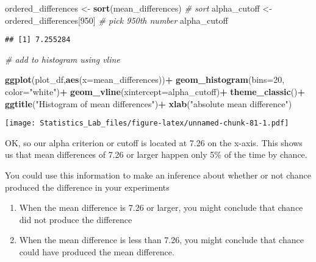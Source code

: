 \documentclass[
]{book}
\newenvironment{Shaded}{\begin{snugshade}}{\end{snugshade}}
\newcommand{\AttributeTok}[1]{\textcolor[rgb]{0.13,0.29,0.53}{#1}}
\newcommand{\CommentTok}[1]{\textcolor[rgb]{0.56,0.35,0.01}{\textit{#1}}}
\newcommand{\DecValTok}[1]{\textcolor[rgb]{0.00,0.00,0.81}{#1}}
\newcommand{\FunctionTok}[1]{\textcolor[rgb]{0.13,0.29,0.53}{\textbf{#1}}}
\newcommand{\NormalTok}[1]{#1}
\newcommand{\OtherTok}[1]{\textcolor[rgb]{0.56,0.35,0.01}{#1}}
\newcommand{\SpecialCharTok}[1]{\textcolor[rgb]{0.81,0.36,0.00}{\textbf{#1}}}
\newcommand{\StringTok}[1]{\textcolor[rgb]{0.31,0.60,0.02}{#1}}
\begin{document}
\begin{Shaded}
\begin{Highlighting}[]
\NormalTok{ordered\_differences }\OtherTok{\textless{}{-}} \FunctionTok{sort}\NormalTok{(mean\_differences) }\CommentTok{\# sort}
\NormalTok{alpha\_cutoff }\OtherTok{\textless{}{-}}\NormalTok{ ordered\_differences[}\DecValTok{950}\NormalTok{] }\CommentTok{\# pick 950th number}
\NormalTok{alpha\_cutoff}
\end{Highlighting}
\end{Shaded}

\begin{verbatim}
## [1] 7.255284
\end{verbatim}

\begin{Shaded}
\begin{Highlighting}[]
\CommentTok{\# add to histogram using vline}

\FunctionTok{ggplot}\NormalTok{(plot\_df,}\FunctionTok{aes}\NormalTok{(}\AttributeTok{x=}\NormalTok{mean\_differences))}\SpecialCharTok{+}
  \FunctionTok{geom\_histogram}\NormalTok{(}\AttributeTok{bins=}\DecValTok{20}\NormalTok{, }\AttributeTok{color=}\StringTok{"white"}\NormalTok{)}\SpecialCharTok{+}
  \FunctionTok{geom\_vline}\NormalTok{(}\AttributeTok{xintercept=}\NormalTok{alpha\_cutoff)}\SpecialCharTok{+}
  \FunctionTok{theme\_classic}\NormalTok{()}\SpecialCharTok{+}
  \FunctionTok{ggtitle}\NormalTok{(}\StringTok{"Histogram of mean differences"}\NormalTok{)}\SpecialCharTok{+}
  \FunctionTok{xlab}\NormalTok{(}\StringTok{"absolute mean difference"}\NormalTok{)}
\end{Highlighting}
\end{Shaded}

\texttt{[image: Statistics\_Lab\_files/figure-latex/unnamed-chunk-81-1.pdf]}

OK, so our alpha criterion or cutoff is located at 7.26 on the x-axis. This shows us that mean differences of 7.26 or larger happen only 5\% of the time by chance.

You could use this information to make an inference about whether or not chance produced the difference in your experiments

\begin{enumerate}
\def\labelenumi{\arabic{enumi}.}
\item
  When the mean difference is 7.26 or larger, you might conclude that chance did not produce the difference
\item
  When the mean difference is less than 7.26, you might conclude that chance could have produced the mean difference.
\end{enumerate}
\end{document}
